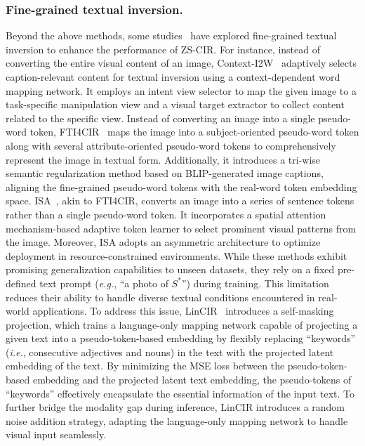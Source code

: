 \subsubsection{Fine-grained textual inversion.}
Beyond the above methods, some studies~\cite{context_i2w, keds, fti4cir, isa} have explored fine-grained textual inversion to enhance the performance of ZS-CIR.
For instance, instead of converting the entire visual content of an image, Context-I2W~\cite{context_i2w} adaptively selects caption-relevant content for textual inversion using a context-dependent word mapping network. It employs an intent view selector to map the given image to a task-specific manipulation view and a visual target extractor to collect content related to the specific view.
Instead of converting an image into a single pseudo-word token, FTI4CIR~\cite{fti4cir} maps the image into a subject-oriented pseudo-word token along with several attribute-oriented pseudo-word tokens to comprehensively represent the image in textual form. Additionally, it introduces a tri-wise semantic regularization method based on BLIP-generated image captions, aligning the fine-grained pseudo-word tokens with the real-word token embedding space.
ISA~\cite{isa}, akin to FTI4CIR, converts an image into a series of sentence tokens rather than a single pseudo-word token. It incorporates a spatial attention mechanism-based adaptive token learner to select prominent visual patterns from the image. Moreover, ISA adopts an asymmetric architecture to optimize deployment in resource-constrained environments.
While these methods exhibit promising generalization capabilities to unseen datasets, they rely on a fixed pre-defined text prompt (\textit{e.g.}, ``a photo of $S^*$'') during training. This limitation reduces their ability to handle diverse textual conditions encountered in real-world applications. To address this issue, LinCIR~\cite{lincir} introduces a self-masking projection, which trains a language-only mapping network capable of projecting a given text into a pseudo-token-based embedding by flexibly replacing ``keywords'' (\textit{i.e.}, consecutive adjectives and nouns) in the text with the projected latent embedding of the text. By minimizing the MSE loss between the pseudo-token-based embedding and the projected latent text embedding, the pseudo-tokens of ``keywords'' effectively encapsulate the essential information of the input text. To further bridge the modality gap during inference, LinCIR introduces a random noise addition strategy, adapting the language-only mapping network to handle visual input seamlessly. 

